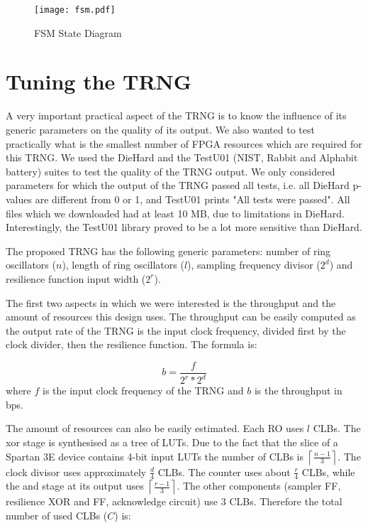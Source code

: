 \documentclass[conference]{IEEEtran}
\begin{document}
\begin{figure*}[!t]
\centering
\texttt{[image: fsm.pdf]}
\caption{FSM State Diagram}
\label{fig:fsm}
\end{figure*}

\section{Tuning the TRNG}
A very important practical aspect of the TRNG is to know the influence of its generic parameters on the quality of its output. We also wanted to test practically what is the smallest number of FPGA resources which are required for this TRNG. We used the DieHard\cite{DieHard} and the TestU01\cite{TestU01} (NIST, Rabbit and Alphabit battery) suites to test the quality of the TRNG output. We only considered parameters for which the output of the TRNG passed all tests, i.e. all DieHard p-values are different from 0 or 1, and TestU01 prints "All tests were passed". All files which we downloaded had at least 10 MB, due to limitations in DieHard. Interestingly, the TestU01 library proved to be a lot more sensitive than DieHard.

The proposed TRNG has the following generic parameters: number of ring oscillators ($n$), length of ring oscillators ($l$), sampling frequency divisor ($2^d$) and resilience function input width ($2^r$).

The first two aspects in which we were interested is the throughput and the amount of resources this design uses. The throughput can be easily computed as the output rate of the TRNG is the input clock frequency, divided first by the clock divider, then the resilience function. The formula is:

\begin{equation}
b = \frac{f}{2^r * 2^d}
\end{equation}
where $f$ is the input clock frequency of the TRNG and $b$ is the throughput in bps.

The amount of resources can also be easily estimated. Each RO uses $l$ CLBs. The xor stage is synthesised as a tree of LUTs. Due to the fact that the slice of a Spartan 3E device contains 4-bit input LUTs the number of CLBs is $ \left\lceil \frac{n-1}{3} \right\rceil $. The clock divisor uses approximately $\frac{d}{4}$ CLBs. The counter uses about $\frac{r}{4}$ CLBs, while the and stage at its output uses $ \left\lceil \frac{r-1}{3} \right\rceil $. The other components (sampler FF, resilience XOR and FF, acknowledge circuit) use 3 CLBs. Therefore the total number of used CLBs ($C$) is:
\end{document}
